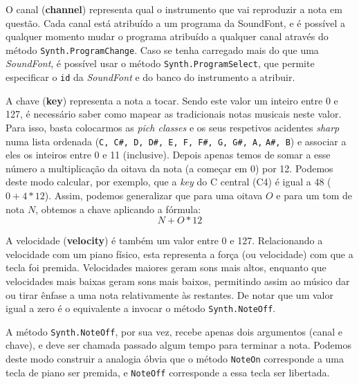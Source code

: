 O canal (\textbf{channel}) representa qual o instrumento que vai reproduzir a nota em questão. Cada canal está atribuído a um programa da SoundFont, e é possível a qualquer momento mudar o programa atribuído a qualquer canal através do método \texttt{Synth.ProgramChange}. Caso se tenha carregado mais do que uma \textit{SoundFont}, é possível usar o método \texttt{Synth.ProgramSelect}, que permite especificar o \texttt{id} da \textit{SoundFont} e do banco do instrumento a atribuir.

A chave (\textbf{key}) representa a nota a tocar. Sendo este valor um inteiro entre 0 e 127, é necessário saber como mapear as tradicionais notas musicais neste valor. Para isso, basta colocarmos as \textit{pich classes} e os seus respetivos acidentes \textit{sharp} numa lista ordenada (\verb|C, C#, D, D#, E, F, F#, G, G#, A,| \verb|A#, B|) e associar a eles os inteiros entre 0 e 11 (inclusive). Depois apenas temos de somar a esse número a multiplicação da oitava da nota (a começar em 0) por 12. Podemos deste modo calcular, por exemplo, que a \textit{key} do C central (C4) é igual a 48 ($0 + 4 * 12$). Assim, podemos generalizar que para uma oitava $O$ e para um tom de nota $N$, obtemos a chave aplicando a fórmula:
$$N + O * 12$$

A velocidade (\textbf{velocity}) é também um valor entre 0 e 127. Relacionando a velocidade com um piano físico, esta representa a força (ou velocidade) com que a tecla foi premida. Velocidades maiores geram sons mais altos, enquanto que velocidades mais baixas geram sons mais baixos, permitindo assim ao músico dar ou tirar ênfase a uma nota relativamente às restantes. De notar que um valor igual a zero é o equivalente a invocar o método \texttt{Synth.NoteOff}.

A método \texttt{Synth.NoteOff}, por sua vez, recebe apenas dois argumentos (canal e chave), e deve ser chamada passado algum tempo para terminar a nota. Podemos deste modo construir a analogia óbvia que o método \texttt{NoteOn} corresponde a uma tecla de piano ser premida, e \texttt{NoteOff} corresponde a essa tecla ser libertada.
